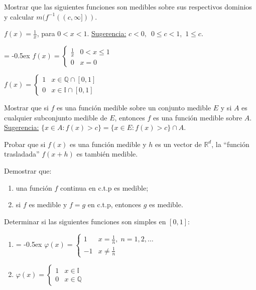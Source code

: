 \documentclass{book}
\newcommand{\rr}{\mathbb{R}}
\newcommand{\qq}{\mathbb{Q}}
\newcommand{\ii}{\mathbb{I}}
\begin{document}
\begin{ejer}{} 
Mostrar que las siguientes funciones son medibles sobre sus respectivos dominios y calcular 
$m(f^{-1}((c,\infty]))$.
\begin{enumerate}
\item  $f(x)=\frac{1}{x}$, para $0<x<1$. \;\;
\underline{Sugerencia:} $c<0,$\, $0\leq c<1$,\, $1\leq c$.
\item* 
{
\extrarowheight = -0.5ex
\renewcommand{\arraystretch}{1.8}
$f(x)=\left\{
\begin{array}{ll}
\frac{1}{x}&0<x\leq 1
\\
0&x=0
\end{array}
\right.$
\item $f(x)=\left\{
\begin{array}{ll}
1&x \in \qq \cap[0,1]
\\
0&x \in \ii\cap[0,1]
\end{array}
\right.
$}
\end{enumerate}
\end{ejer}


\begin{ejer}{} 
Mostrar que si $f$ es una funci\'on  medible sobre un conjunto medible $E$ y si $A$ es cualquier subconjunto medible de $E$, entonces $f$ es una funci\'on medible sobre $A$.
\\
\underline{Sugerencia:}  $\{x \in A: f(x)>c \}=\{ x\in E: f(x)>c\}\cap A.$
\end{ejer}




\begin{ejer}{} 
Probar que si $f(x)$ es una función medible y $h$ es un vector de $\rr^d$, la ``función 
trasladada'' $f(x+h)$ es también medible.
\end{ejer}

\begin{ejer}{} 
 Demostrar que: 
	\begin{enumerate}
\item una función $f$ continua en c.t.p es medible;
\item si $f$ es medible y $f=g$ en c.t.p, entonces $g$ es medible.
	\end{enumerate}
	\end{ejer}


\begin{ejer}{} 
Determinar si las siguientes funciones son simples en $[0,1]$:
\begin{enumerate}
\item 
{
\extrarowheight = -0.5ex
\renewcommand{\arraystretch}{1.8}
$\varphi(x)=
\left\{
\begin{array}{rl}
1& x=\frac{1}{n},\;n=1,2,\dots
\\
-1&x\neq \frac{1}{n}
\end{array}
\right.
$}
\item 
$\varphi(x)=
\left\{
\begin{array}{ll}
1& x \in \ii
\\
0&x\in \qq
\end{array}
\right.
$
\end{enumerate}
\end{ejer}
\end{document}
